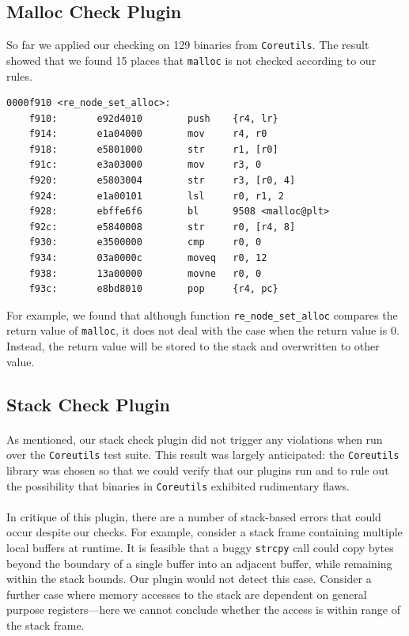 \documentclass[letterpaper,11pt]{article}
\begin{document}
\subsection{Malloc Check Plugin}
So far we applied our checking on 129 binaries from \texttt{Coreutils}. The
result showed that we found 15 places that \texttt{malloc} is not checked
according to our rules.
\begin{center}
\lstset{language=C, label=strcpy,
caption=Function re\_node\_set\_alloc, breaklines=true, basicstyle=\tiny, numbers=none}
\begin{lstlisting}
0000f910 <re_node_set_alloc>:
    f910:       e92d4010        push    {r4, lr}
    f914:       e1a04000        mov     r4, r0
    f918:       e5801000        str     r1, [r0]
    f91c:       e3a03000        mov     r3, 0
    f920:       e5803004        str     r3, [r0, 4]
    f924:       e1a00101        lsl     r0, r1, 2
    f928:       ebffe6f6        bl      9508 <malloc@plt>
    f92c:       e5840008        str     r0, [r4, 8]
    f930:       e3500000        cmp     r0, 0
    f934:       03a0000c        moveq   r0, 12
    f938:       13a00000        movne   r0, 0
    f93c:       e8bd8010        pop     {r4, pc}
\end{lstlisting}
\end{center}
For example, we found that although function \texttt{re\_node\_set\_alloc}
compares the return value of \texttt{malloc}, it does not deal with the case
when the return value is 0. Instead, the return value will be stored to the
stack and overwritten to other value.

\subsection{Stack Check Plugin}

\paragraph{}
As mentioned, our stack check plugin did not trigger any violations when run
over the \texttt{Coreutils} test suite. This result was largely anticipated:
the \texttt{Coreutils} library was chosen so that we could verify that our
plugins run and to rule out the possibility that binaries in \texttt{Coreutils}
exhibited rudimentary flaws.

\paragraph{}
In critique of this plugin, there are a number of stack-based errors that could
occur despite our checks. For example, consider a stack frame containing
multiple local buffers at runtime. It is feasible that a buggy \texttt{strcpy}
call could copy bytes beyond the boundary of a single buffer into an adjacent
buffer, while remaining within the stack bounds. Our plugin would not detect
this case. Consider a further case where memory accesses to the stack
are dependent on general purpose registers---here we cannot conclude
whether the access is within range of the stack frame.
\end{document}
